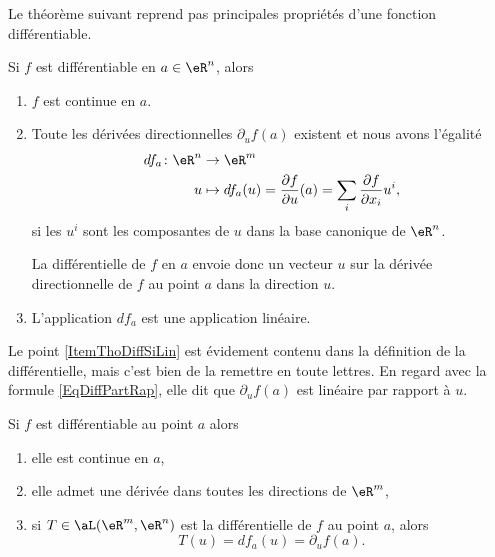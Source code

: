 Le théorème suivant reprend pas principales propriétés d'une fonction différentiable.
\begin{theorem}     \label{ThoRapPropDiffSi}
Si $f$ est différentiable en $a\in\eR^n$, alors
\begin{enumerate}
\item $f$ est continue en $a$.

\item  Toute les dérivées directionnelles $\partial_uf(a)$ existent et nous avons l'égalité
\begin{equation}        \label{EqDiffPartRap}
    \begin{aligned}
        df_a\colon \eR^n&\to \eR^m \\
        u&\mapsto df_a(u)=\frac{ \partial f }{ \partial u }(a)=\sum_i \frac{ \partial f }{ \partial x_i }u^i,
    \end{aligned}
\end{equation}
si les $u^i$ sont les composantes de $u$ dans la base canonique de $\eR^n$.

La différentielle de $f$ en $a$ envoie donc un vecteur $u$ sur la dérivée directionnelle de $f$ au point $a$ dans la direction $u$. 

\item\label{ItemThoDiffSiLin} L'application $df_a$ est une application linéaire.
\end{enumerate}
\end{theorem}
Le point \ref{ItemThoDiffSiLin} est évidement contenu dans la définition de la différentielle, mais c'est bien de la remettre en toute lettres. En regard avec la formule \eqref{EqDiffPartRap}, elle dit que $\partial_uf(a)$ est linéaire par rapport à $u$.


\begin{proposition}\label{diff1}
    Si $f$ est différentiable au point $a$ alors
    \begin{enumerate}
        \item
            elle est continue en \( a\),
        \item
            elle admet une dérivée dans toutes les directions de \( \eR^m\),
        \item
            si $T\in\aL(\eR^m,\eR^n)$ est la différentielle de $f$ au point $a$, alors
            \begin{equation}
                T(u)=df_a(u)=\partial_u f(a). 
            \end{equation}
    \end{enumerate}
\end{proposition}

